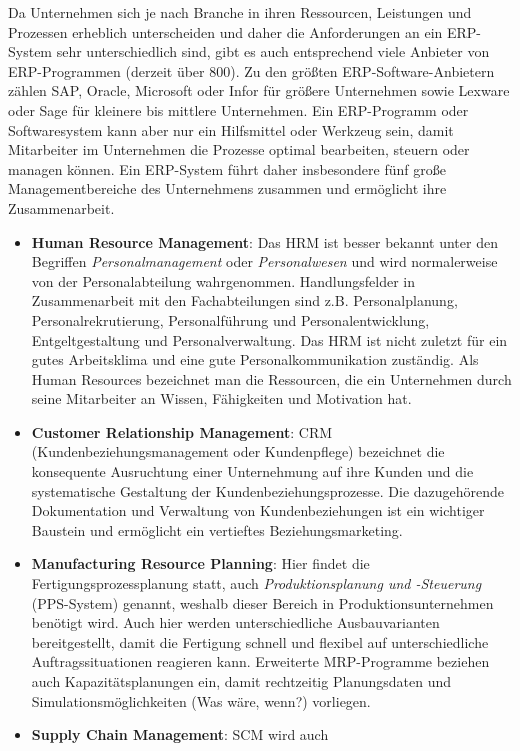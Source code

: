 \documentclass[a4paper, 12pt]{report}
\begin{document}
Da Unternehmen sich je nach Branche in ihren Ressourcen, Leistungen und
Prozessen erheblich unterscheiden und daher die Anforderungen an ein ERP-System
sehr unterschiedlich sind, gibt es auch entsprechend viele Anbieter von
ERP-Programmen (derzeit über 800). Zu den größten ERP-Software-Anbietern zählen
SAP, Oracle, Microsoft oder Infor für größere Unternehmen sowie Lexware oder
Sage für kleinere bis mittlere Unternehmen. Ein ERP-Programm oder Softwaresystem
kann aber nur ein Hilfsmittel oder Werkzeug sein, damit Mitarbeiter im
Unternehmen die Prozesse optimal bearbeiten, steuern oder managen können. Ein
ERP-System führt daher insbesondere fünf große Managementbereiche des
Unternehmens zusammen und ermöglicht ihre Zusammenarbeit.

\newpage
\begin{itemize}
    \item \textbf{Human Resource Management}: Das HRM ist besser bekannt unter
	den Begriffen \emph{Personalmanagement} oder \emph{Personalwesen} und
	wird normalerweise von der Personalabteilung wahrgenommen.
	Handlungsfelder in Zusammenarbeit mit den Fachabteilungen sind z.B.
	Personalplanung, Personalrekrutierung, Personalführung und
	Personalentwicklung, Entgeltgestaltung und Personalverwaltung. Das HRM
	ist nicht zuletzt für ein gutes Arbeitsklima und eine gute
	Personalkommunikation zuständig. Als Human Resources bezeichnet man die
	Ressourcen, die ein Unternehmen durch seine Mitarbeiter an Wissen,
	Fähigkeiten und Motivation hat.
    \item \textbf{Customer Relationship Management}: CRM
	(Kundenbeziehungsmanagement oder Kundenpflege) bezeichnet die
	konsequente Ausruchtung einer Unternehmung auf ihre Kunden und die
	systematische Gestaltung der Kundenbeziehungsprozesse. Die dazugehörende
	Dokumentation und Verwaltung von Kundenbeziehungen ist ein wichtiger
	Baustein und ermöglicht ein vertieftes Beziehungsmarketing.
    \item \textbf{Manufacturing Resource Planning}: Hier findet die
	Fertigungsprozessplanung statt, auch \emph{Produktionsplanung und
	-Steuerung} (PPS-System) genannt, weshalb dieser Bereich in
	Produktionsunternehmen benötigt wird. Auch hier werden unterschiedliche
	Ausbauvarianten bereitgestellt, damit die Fertigung schnell und flexibel
	auf unterschiedliche Auftragssituationen reagieren kann. Erweiterte
	MRP-Programme beziehen auch Kapazitätsplanungen ein, damit rechtzeitig
	Planungsdaten und Simulationsmöglichkeiten (Was wäre, wenn?) vorliegen.
    \item \textbf{Supply Chain Management}: SCM wird auch

\end{itemize}
\end{document}
